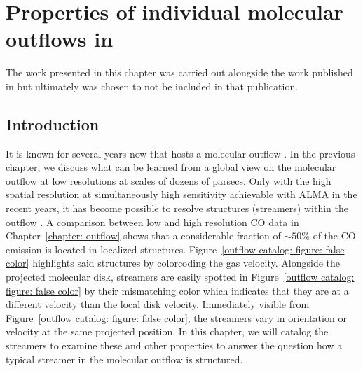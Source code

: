 
\chapter{Properties of individual molecular outflows in }
\label{chapter: outflow catalog}


\begin{papernote}
The work presented in this chapter was carried out alongside the work published in \citet[; Chapter~\ref{chapter: outflow}]{2019ApJ...881...43K} but ultimately was chosen to not be included in that publication.
\end{papernote}



\section{Introduction}\label{outflow catalog: section: introduction}

It is known for several years now that  hosts a molecular outflow \citep{2006ApJ...636..685S,2013Natur.499..450B}. In the previous chapter, we discuss what can be learned from a global view on the molecular outflow at low resolutions at scales of dozens of parsecs.
Only with the high spatial resolution at simultaneously high sensitivity achievable with ALMA in the recent years, it has become possible to resolve structures (streamers) within the outflow \citep{2017ApJ...835..265W}. 
A comparison between low and high resolution CO data in Chapter~\ref{chapter: outflow} shows that a considerable fraction of $\sim50$\% of the CO emission is located in localized structures.
Figure~\ref{outflow catalog: figure: false color} highlights said structures by colorcoding the gas velocity. %
Alongside the projected molecular disk, streamers are easily spotted in Figure~\ref{outflow catalog: figure: false color} by their mismatching color which indicates that they are at a different velocity than the local disk velocity.
Immediately visible from Figure~\ref{outflow catalog: figure: false color}, the streamers vary in orientation or velocity at the same projected position. In this chapter, we will catalog the streamers to examine these and other properties to answer the question how a typical streamer in the molecular outflow is structured.

